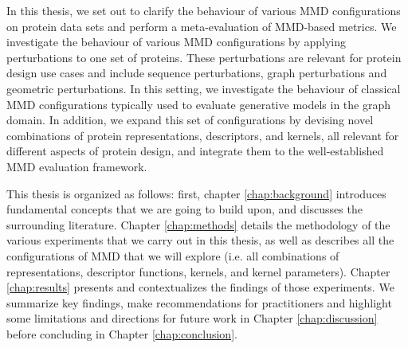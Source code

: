In this thesis, we set out to clarify the behaviour of various MMD
configurations on protein data sets and perform a meta-evaluation of MMD-based
metrics. We investigate the behaviour of various MMD configurations by applying
perturbations to one set of proteins. These perturbations are relevant for
protein design use cases and include sequence perturbations, graph perturbations
and geometric perturbations. In this setting, we investigate the behaviour of
classical MMD configurations typically used to evaluate generative models in the
graph domain. In addition, we expand this set of configurations by devising
novel combinations of protein representations, descriptors, and kernels, all
relevant for different aspects of protein design, and integrate them to the
well-established MMD evaluation framework.

This thesis is organized as follows: first, chapter \ref{chap:background}
introduces fundamental concepts that we are going to build upon, and discusses
the surrounding literature. Chapter \ref{chap:methods} details the methodology
of the various experiments that we carry out in this thesis, as well as
describes all the configurations of MMD that we will explore (i.e. all
combinations of representations, descriptor functions, kernels, and kernel
parameters). Chapter \ref{chap:results} presents and contextualizes the findings of those
experiments. We summarize key findings, make recommendations for practitioners and
highlight some limitations and directions for future work in Chapter
\ref{chap:discussion} before concluding in Chapter \ref{chap:conclusion}.





